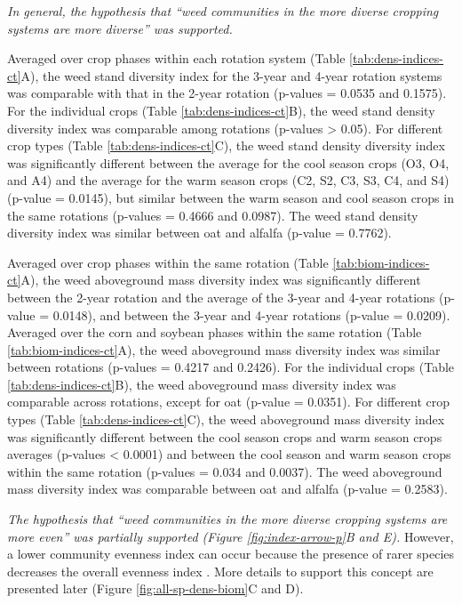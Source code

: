 \documentclass[
]{article}
\begin{document}
\emph{In general, the hypothesis that ``weed communities in the more diverse cropping systems are more diverse'' was supported.}

Averaged over crop phases within each rotation system (Table \ref{tab:dens-indices-ct}A), the weed stand diversity index for the 3-year and 4-year rotation systems was comparable with that in the 2-year rotation (p-values = 0.0535 and 0.1575). For the individual crops (Table \ref{tab:dens-indices-ct}B), the weed stand density diversity index was comparable among rotations (p-values \textgreater{} 0.05). For different crop types (Table \ref{tab:dens-indices-ct}C), the weed stand density diversity index was significantly different between the average for the cool season crops (O3, O4, and A4) and the average for the warm season crops (C2, S2, C3, S3, C4, and S4) (p-value = 0.0145), but similar between the warm season and cool season crops in the same rotations (p-values = 0.4666 and 0.0987). The weed stand density diversity index was similar between oat and alfalfa (p-value = 0.7762).

Averaged over crop phases within the same rotation (Table \ref{tab:biom-indices-ct}A), the weed aboveground mass diversity index was significantly different between the 2-year rotation and the average of the 3-year and 4-year rotations (p-value = 0.0148), and between the 3-year and 4-year rotations (p-value = 0.0209). Averaged over the corn and soybean phases within the same rotation (Table \ref{tab:biom-indices-ct}A), the weed aboveground mass diversity index was similar between rotations (p-values = 0.4217 and 0.2426). For the individual crops (Table \ref{tab:dens-indices-ct}B), the weed aboveground mass diversity index was comparable across rotations, except for oat (p-value = 0.0351). For different crop types (Table \ref{tab:dens-indices-ct}C), the weed aboveground mass diversity index was significantly different between the cool season crops and warm season crops averages (p-values \textless{} 0.0001) and between the cool season and warm season crops within the same rotation (p-values = 0.034 and 0.0037). The weed aboveground mass diversity index was comparable between oat and alfalfa (p-value = 0.2583).

\emph{The hypothesis that ``weed communities in the more diverse cropping systems are more even'' was partially supported (Figure \ref{fig:index-arrow-p}B and E).} However, a lower community evenness index can occur because the presence of rarer species decreases the overall evenness index \citep{stirlingEmpiricalRelationshipsSpecies2001}. More details to support this concept are presented later (Figure \ref{fig:all-sp-dens-biom}C and D).
\end{document}
